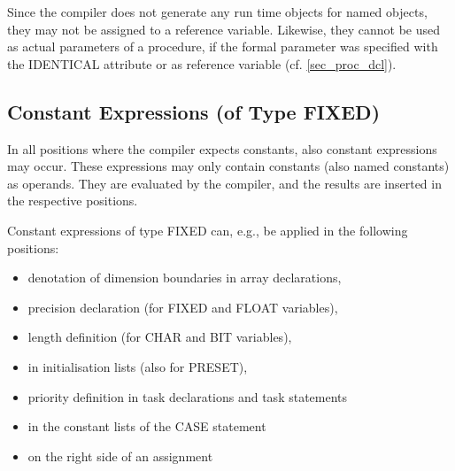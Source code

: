 Since the compiler does not generate any run time objects for named
objects, they may not be assigned to a reference variable. Likewise,
they cannot be used as actual parameters of a procedure, if the formal
parameter was specified with the IDENTICAL attribute or as reference
variable (cf. \ref{sec_proc_dcl}).

\subsection{Constant Expressions (of Type FIXED)}   %
\label{sec_const_expression}

In all positions where the compiler expects constants, also constant
expressions may occur. These expressions may only contain constants
(also named constants) as operands. They are evaluated by the compiler,
and the results are inserted in the respective positions.












Constant expressions of type FIXED can, e.g., be applied in the
following positions:
\begin{itemize}
\item denotation of dimension boundaries in array declarations,
\item precision declaration (for FIXED and FLOAT variables),
\item length definition (for CHAR and BIT variables),
\item in initialisation lists (also for PRESET),
\item priority definition in task declarations and task statements
\item in the constant lists of the CASE statement
\item on the right side of an assignment
\end{itemize}

